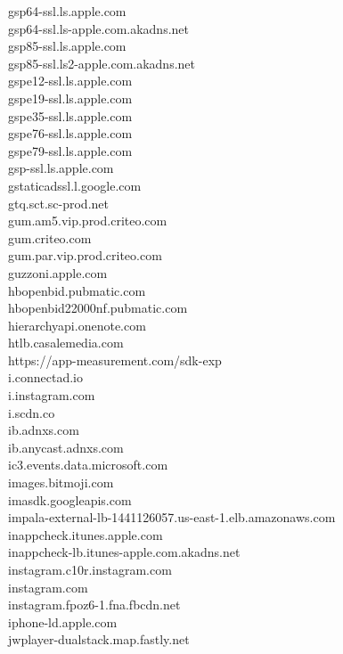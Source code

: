 \documentclass[12pt,a4paper]{article}
\begin{document}
\begin{scriptsize}
\begin{multicols}{3}
\begin{center}
                    gsp64-ssl.ls.apple.com\\gsp64-ssl.ls-apple.com.akadns.net\\gsp85-ssl.ls.apple.com\\gsp85-ssl.ls2-apple.com.akadns.net\\
                    gspe12-ssl.ls.apple.com\\gspe19-ssl.ls.apple.com\\gspe35-ssl.ls.apple.com\\gspe76-ssl.ls.apple.com\\gspe79-ssl.ls.apple.com\\
                    gsp-ssl.ls.apple.com\\gstaticadssl.l.google.com\\gtq.sct.sc-prod.net\\gum.am5.vip.prod.criteo.com\\gum.criteo.com\\
                    gum.par.vip.prod.criteo.com\\guzzoni.apple.com\\hbopenbid.pubmatic.com\\hbopenbid22000nf.pubmatic.com\\
                    hierarchyapi.onenote.com\\htlb.casalemedia.com\\https://app-measurement.com/sdk-exp\\i.connectad.io\\i.instagram.com\\
                    i.scdn.co\\ib.adnxs.com\\ib.anycast.adnxs.com\\ic3.events.data.microsoft.com\\images.bitmoji.com\\imasdk.googleapis.com\\
                    impala-external-lb-1441126057.us-east-1.elb.amazonaws.com\\inappcheck.itunes.apple.com\\inappcheck-lb.itunes-apple.com.akadns.net\\
                    instagram.c10r.instagram.com\\instagram.com\\instagram.fpoz6-1.fna.fbcdn.net\\iphone-ld.apple.com\\jwplayer-dualstack.map.fastly.net\\

\end{center}
\end{multicols}
\end{scriptsize}
\end{document}
